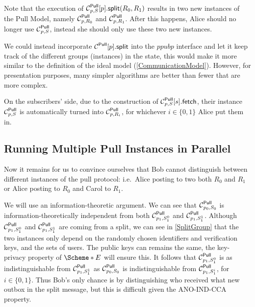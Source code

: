 Note that the execution of \(\psplit[p, S]{p}[R_0, R_1]\) results in two new 
instances of the Pull Model, namely \(\Pull[p, R_0]\) and \(\Pull[p, R_1]\).
After this happens, Alice should no longer use \(\Pull[p, S]\), instead she 
should only use these two new instances.

We could instead incorporate \(\psplit{p}\) into the \(ppub{p}\) interface and 
let it keep track of the different groups (instances) in the state, this would 
make it more similar to the definition of the ideal model 
(\cref{CommunicationModel}).
However, for presentation purposes, many simpler algorithms are better than 
fewer that are more complex.

On the subscribers' side, due to the construction of \(\pget[p, S]{s}\), their 
instance \(\Pull[p, S]\) is automatically turned into \(\Pull[p, R_i]\), for 
whichever \(i\in \{0, 1\}\) Alice put them in.

\subsection{Running Multiple Pull Instances in Parallel}
\label{ParallelPull}

Now it remains for us to convince ourselves that Bob cannot distinguish between
different instances of the pull protocol: i.e.\ Alice posting to two both 
\(R_0\) and \(R_1\) or Alice posting to \(R_0\) and Carol to \(R_1\).

We will use an information-theoretic argument.
We can see that \(\Pull[p_0, S_0]\) is information-theoretically independent 
from both \(\Pull[p_1, S_1^0]\) and \(\Pull[p_1, S_1^1]\).
Although \(\Pull[p_1, S_1^0]\) and \(\Pull[p_1, S_1^1]\) are coming from 
a split, we can see in \cref{SplitGroup} that the two instances only depend 
on the randomly chosen identifiers and verification keys, and the sets of 
users.
The public keys can remains the same, the key-privacy property of \(\E*\) will 
ensure this.
It follows that \(\Pull[p_1, S_1^0]\) is as indistinguishable from \(\Pull[p_1, 
  S_1^1]\) as \(\Pull[p_0, S_0]\) is indistinguishable from \(\Pull[p_1, 
  S_1^i]\), for \(i\in \{0, 1\}\).
Thus Bob's only chance is by distinguishing who received what new outbox in the 
split message, but this is difficult given the ANO-IND-CCA property.

